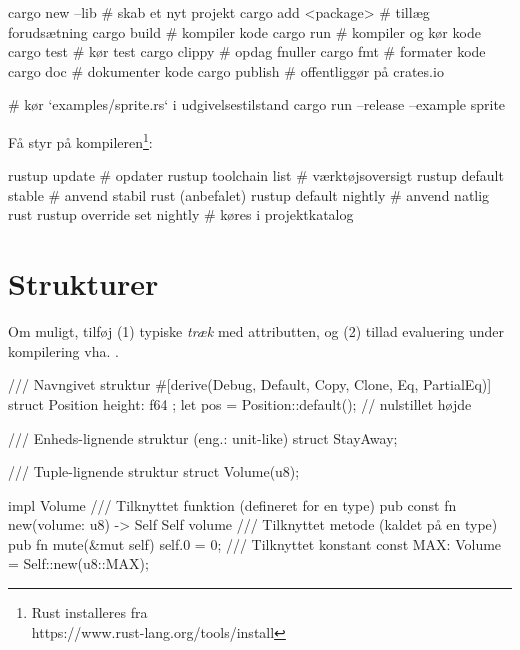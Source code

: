\documentclass{article}
\begin{document}
\begin{bashcode}
cargo new {--lib}   # skab et nyt projekt
cargo add <package> # tillæg forudsætning
cargo build         # kompiler kode
cargo run           # kompiler og kør kode
cargo test          # kør test
cargo clippy        # opdag fnuller
cargo fmt           # formater kode
cargo doc           # dokumenter kode
cargo publish       # offentliggør på crates.io

# kør `examples/sprite.rs` i udgivelsestilstand
cargo run --release --example sprite
\end{bashcode}

\noindent Få styr på kompileren\footnote{Rust installeres fra\\
https://www.rust-lang.org/tools/install}:

\begin{bashcode}
rustup update               # opdater
rustup toolchain list       # værktøjsoversigt
rustup default stable       # anvend stabil rust (anbefalet)
rustup default nightly      # anvend natlig rust
rustup override set nightly # køres i projektkatalog
\end{bashcode}



\newpage
\section*{Strukturer}

Om muligt, tilføj (1) typiske \emph{træk} med  attributten, og
(2) tillad evaluering under kompilering vha.  .

\begin{rustcode}
/// Navngivet struktur
#[derive(Debug, Default, Copy, Clone, Eq, PartialEq)]
struct Position { height: f64 };
let pos = Position::default(); // nulstillet højde

/// Enheds-lignende struktur (eng.: unit-like)
struct StayAway;

/// Tuple-lignende struktur
struct Volume(u8);

impl Volume {
    /// Tilknyttet funktion (defineret for en type)
    pub const fn new(volume: u8) -> Self {
        Self {volume}
    }
    /// Tilknyttet metode (kaldet på en type)
    pub fn mute(&mut self) {
        self.0 = 0;
    }
    /// Tilknyttet konstant
    const MAX: Volume = Self::new(u8::MAX);
}
\end{rustcode}
\end{document}
